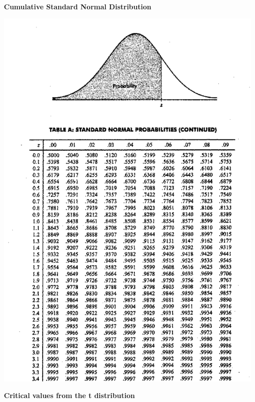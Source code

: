 \documentclass[]{book}
\begin{document}
\newpage

\textbf{Cumulative Standard Normal Distribution}

\begin{center}\includegraphics[width=1\linewidth]{figure/ztable} \end{center}

\newpage

\textbf{Critical values from the t distribution}
\end{document}
